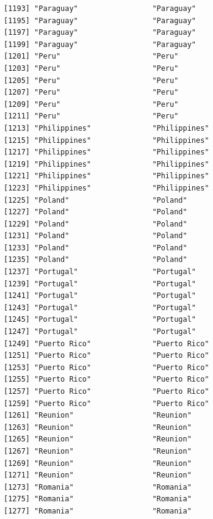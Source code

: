 \documentclass[
  letterpaper,
  DIV=11,
  numbers=noendperiod]{scrreprt}
\begin{document}
\begin{verbatim}
[1193] "Paraguay"                 "Paraguay"                
[1195] "Paraguay"                 "Paraguay"                
[1197] "Paraguay"                 "Paraguay"                
[1199] "Paraguay"                 "Paraguay"                
[1201] "Peru"                     "Peru"                    
[1203] "Peru"                     "Peru"                    
[1205] "Peru"                     "Peru"                    
[1207] "Peru"                     "Peru"                    
[1209] "Peru"                     "Peru"                    
[1211] "Peru"                     "Peru"                    
[1213] "Philippines"              "Philippines"             
[1215] "Philippines"              "Philippines"             
[1217] "Philippines"              "Philippines"             
[1219] "Philippines"              "Philippines"             
[1221] "Philippines"              "Philippines"             
[1223] "Philippines"              "Philippines"             
[1225] "Poland"                   "Poland"                  
[1227] "Poland"                   "Poland"                  
[1229] "Poland"                   "Poland"                  
[1231] "Poland"                   "Poland"                  
[1233] "Poland"                   "Poland"                  
[1235] "Poland"                   "Poland"                  
[1237] "Portugal"                 "Portugal"                
[1239] "Portugal"                 "Portugal"                
[1241] "Portugal"                 "Portugal"                
[1243] "Portugal"                 "Portugal"                
[1245] "Portugal"                 "Portugal"                
[1247] "Portugal"                 "Portugal"                
[1249] "Puerto Rico"              "Puerto Rico"             
[1251] "Puerto Rico"              "Puerto Rico"             
[1253] "Puerto Rico"              "Puerto Rico"             
[1255] "Puerto Rico"              "Puerto Rico"             
[1257] "Puerto Rico"              "Puerto Rico"             
[1259] "Puerto Rico"              "Puerto Rico"             
[1261] "Reunion"                  "Reunion"                 
[1263] "Reunion"                  "Reunion"                 
[1265] "Reunion"                  "Reunion"                 
[1267] "Reunion"                  "Reunion"                 
[1269] "Reunion"                  "Reunion"                 
[1271] "Reunion"                  "Reunion"                 
[1273] "Romania"                  "Romania"                 
[1275] "Romania"                  "Romania"                 
[1277] "Romania"                  "Romania"                 

\end{verbatim}
\end{document}
